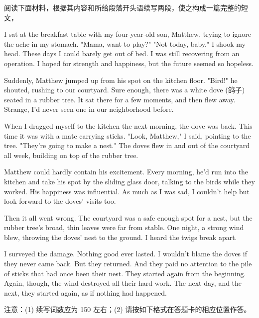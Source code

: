\documentclass{英语试卷}
\begin{document}
\par 阅读下面材料，根据其内容和所给段落开头语续写两段，使之构成一篇完整的短文，\par
\par I sat at the breakfast table with my four-year-old son, Matthew, trying to ignore the ache in my stomach. "Mama, want to play?" "Not today, baby." I shook my head. These days I could barely get out of bed. I was still recovering from an operation. I hoped for strength and happiness, but the future seemed so hopeless.\par
\par Suddenly, Matthew jumped up from his spot on the kitchen floor. "Bird!" he shouted, rushing to our courtyard. Sure enough, there was a white dove (鸽子) seated in a rubber tree. It sat there for a few moments, and then flew away. Strange, I'd never seen one in our neighborhood before.\par
\par When I dragged myself to the kitchen the next morning, the dove was back. This time it was with a mate carrying sticks. "Look, Matthew," I said, pointing to the tree. "They're going to make a nest." The doves flew in and out of the courtyard all week, building on top of the rubber tree.\par
\par Matthew could hardly contain his excitement. Every morning, he'd run into the kitchen and take his spot by the sliding glass door, talking to the birds while they worked. His happiness was influential. As much as I was sad, I couldn't help but look forward to the doves' visits too.\par
\par Then it all went wrong. The courtyard was a safe enough spot for a nest, but the rubber tree's broad, thin leaves were far from stable. One night, a strong wind blew, throwing the doves' nest to the ground. I heard the twigs break apart.\par
\par I surveyed the damage. Nothing good ever lasted. I wouldn't blame the doves if they never came back. But they returned. And they paid no attention to the pile of sticks that had once been their nest. They started again from the beginning. Again, though, the wind destroyed all their hard work. The next day, and the next, they started again, as if nothing had happened.\par
\par 注意：(1) 续写词数应为 150 左右；(2) 请按如下格式在答题卡的相应位置作答。\par
{}
\end{document}
